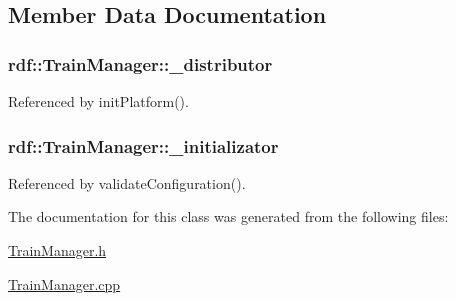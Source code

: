 \subsection{Member Data Documentation}
\subsubsection[{\texorpdfstring{\+\_\+distributor}{_distributor}}]{ rdf\+::\+Train\+Manager\+::\+\_\+distributor\hspace{0.3cm}{\ttfamily [private]}}\hypertarget{classrdf_1_1TrainManager_aa0755d00120e30bb7317dae406758c44}{}\label{classrdf_1_1TrainManager_aa0755d00120e30bb7317dae406758c44}


Referenced by init\+Platform().

\subsubsection[{\texorpdfstring{\+\_\+initializator}{_initializator}}]{ rdf\+::\+Train\+Manager\+::\+\_\+initializator\hspace{0.3cm}{\ttfamily [private]}}\hypertarget{classrdf_1_1TrainManager_a927ff849445fee16860fbb41c774554c}{}\label{classrdf_1_1TrainManager_a927ff849445fee16860fbb41c774554c}


Referenced by validate\+Configuration().



The documentation for this class was generated from the following files\+:\begin{DoxyCompactItemize}
\item 
\hyperlink{TrainManager_8h}{Train\+Manager.\+h}\item 
\hyperlink{TrainManager_8cpp}{Train\+Manager.\+cpp}\end{DoxyCompactItemize}
